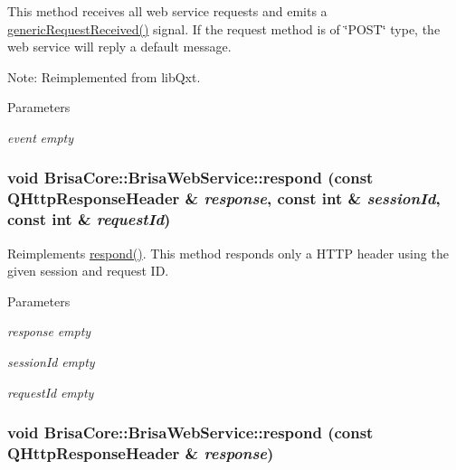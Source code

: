 This method receives all web service requests and emits a \hyperlink{classBrisaCore_1_1BrisaWebService_ad94a4a9cd45a90dc56559ac86728c61b}{genericRequestReceived()} signal. If the request method is of \char`\"{}POST\char`\"{} type, the web service will reply a default message.

Note: Reimplemented from libQxt.


\begin{DoxyParams}{Parameters}
\item[{\em event}]{\itshape empty\/} \end{DoxyParams}
\hypertarget{classBrisaCore_1_1BrisaWebService_aa1cead2f4057de3dda2eb0e5dbc6efe2}{
\subsubsection[{respond}]{\setlength{\rightskip}{0pt plus 5cm}void BrisaCore::BrisaWebService::respond (const QHttpResponseHeader \& {\em response}, \/  const int \& {\em sessionId}, \/  const int \& {\em requestId})}}
\label{classBrisaCore_1_1BrisaWebService_aa1cead2f4057de3dda2eb0e5dbc6efe2}


Reimplements \hyperlink{classBrisaCore_1_1BrisaWebService_a4065f685234edf9f4c1bda00549060c7}{respond()}. This method responds only a HTTP header using the given session and request ID.


\begin{DoxyParams}{Parameters}
\item[{\em response}]{\itshape empty\/} \item[{\em sessionId}]{\itshape empty\/} \item[{\em requestId}]{\itshape empty\/} \end{DoxyParams}
\hypertarget{classBrisaCore_1_1BrisaWebService_a54a5f8ab170bc1e5f97cac6f508deb50}{
\subsubsection[{respond}]{\setlength{\rightskip}{0pt plus 5cm}void BrisaCore::BrisaWebService::respond (const QHttpResponseHeader \& {\em response})}}
\label{classBrisaCore_1_1BrisaWebService_a54a5f8ab170bc1e5f97cac6f508deb50}


